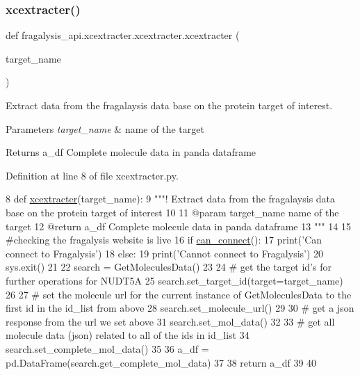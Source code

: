 \subsubsection{\texorpdfstring{xcextracter()}{xcextracter()}}
{\footnotesize\ttfamily def fragalysis\+\_\+api.\+xcextracter.\+xcextracter.\+xcextracter (\begin{DoxyParamCaption}\item[{}]{target\+\_\+name }\end{DoxyParamCaption})}



Extract data from the fragalaysis data base on the protein target of interest. 


\begin{DoxyParams}{Parameters}
{\em target\+\_\+name} & name of the target \\
\hline
\end{DoxyParams}
\begin{DoxyReturn}{Returns}
a\+\_\+df Complete molecule data in panda dataframe 
\end{DoxyReturn}


Definition at line 8 of file xcextracter.\+py.


\begin{DoxyCode}
8 \textcolor{keyword}{def }\hyperlink{namespacefragalysis__api_1_1xcextracter_1_1xcextracter_a9aad6a3badcb479c966f153ce6b87126}{xcextracter}(target\_name):
9     \textcolor{stringliteral}{"""! Extract data from the fragalaysis data base on the protein target of interest}
10 \textcolor{stringliteral}{}
11 \textcolor{stringliteral}{    @param target\_name name of the target}
12 \textcolor{stringliteral}{    @return a\_df Complete molecule data in panda dataframe}
13 \textcolor{stringliteral}{    """}
14 
15     \textcolor{comment}{#checking the fragalysis website is live}
16     \textcolor{keywordflow}{if} \hyperlink{namespacefragalysis__api_1_1xcextracter_1_1frag__web__live_a0c358bb08db16e67b947ea3e06a2516c}{can\_connect}():
17         print(\textcolor{stringliteral}{'Can connect to Fragalysis'})
18     \textcolor{keywordflow}{else}:
19         print(\textcolor{stringliteral}{'Cannot connect to Fragalysis'})
20         sys.exit()
21 
22     search = GetMoleculesData()
23 
24     \textcolor{comment}{# get the target id's for further operations for NUDT5A}
25     search.set\_target\_id(target=target\_name)
26 
27     \textcolor{comment}{# set the molecule url for the current instance of GetMoleculesData to the first id in the id\_list from
       above}
28     search.set\_molecule\_url()
29 
30     \textcolor{comment}{# get a json response from the url we set above}
31     search.set\_mol\_data()
32 
33     \textcolor{comment}{# get all molecule data (json) related to all of the ids in id\_list}
34     search.set\_complete\_mol\_data()
35 
36     a\_df = pd.DataFrame(search.get\_complete\_mol\_data)
37 
38     \textcolor{keywordflow}{return} a\_df
39 
40 
\end{DoxyCode}


